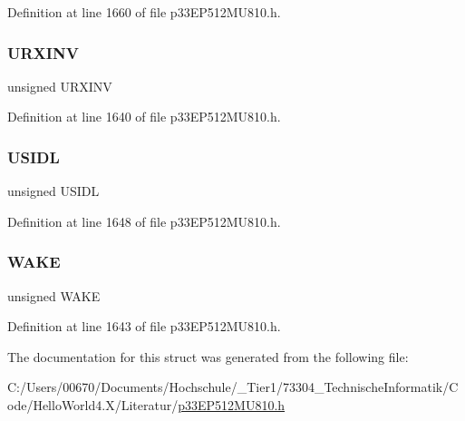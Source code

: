 Definition at line 1660 of file p33\+E\+P512\+M\+U810.\+h.

\mbox{\label{structtag_u1_m_o_d_e_b_i_t_s_ab6387939f9a8bc487f0eab6e20afd53d}} 
\subsubsection{\texorpdfstring{U\+R\+X\+I\+NV}{URXINV}}
{\footnotesize\ttfamily unsigned U\+R\+X\+I\+NV}



Definition at line 1640 of file p33\+E\+P512\+M\+U810.\+h.

\mbox{\label{structtag_u1_m_o_d_e_b_i_t_s_a94d25c6c9271a4ab4f450319e34e2a00}} 
\subsubsection{\texorpdfstring{U\+S\+I\+DL}{USIDL}}
{\footnotesize\ttfamily unsigned U\+S\+I\+DL}



Definition at line 1648 of file p33\+E\+P512\+M\+U810.\+h.

\mbox{\label{structtag_u1_m_o_d_e_b_i_t_s_a364c8b1b2c2f66b23dd1093ced3e20dd}} 
\subsubsection{\texorpdfstring{W\+A\+KE}{WAKE}}
{\footnotesize\ttfamily unsigned W\+A\+KE}



Definition at line 1643 of file p33\+E\+P512\+M\+U810.\+h.



The documentation for this struct was generated from the following file\+:\begin{DoxyCompactItemize}
\item 
C\+:/\+Users/00670/\+Documents/\+Hochschule/\+\_\+\+Tier1/73304\+\_\+\+Technische\+Informatik/\+Code/\+Hello\+World4.\+X/\+Literatur/\hyperlink{p33_e_p512_m_u810_8h}{p33\+E\+P512\+M\+U810.\+h}\end{DoxyCompactItemize}
